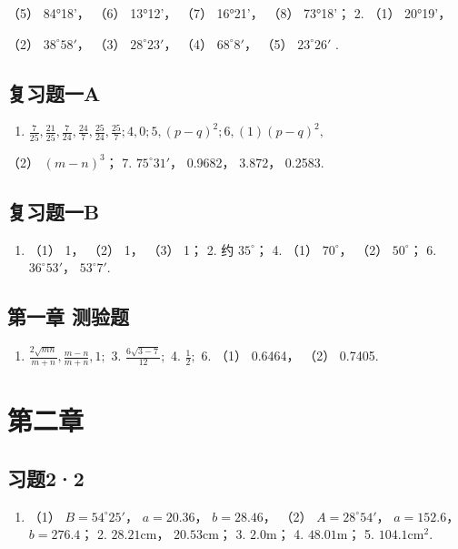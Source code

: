 （5） 84°18'， （6） 13°12'， （7） 16°21'， （8） 73°18'； 2. （1）
20°19'，

（2） \(38^{\circ}58'\)， （3） \(28^{\circ}23'\)， （4）
\(68^{\circ}8'\)， （5） \(23^{\circ}26'\) .

\subsection{复习题一A}

\begin{enumerate}
\item
  \(\frac{7}{25}, \frac{21}{25}, \frac{7}{24}, \frac{24}{7}, \frac{25}{24}, \frac{25}{7}; 4, 0; 5, (p - q)^2; 6, (1) (p - q)^2,\)
\end{enumerate}

（2） \((m - n)^{3}\)； 7. \(75^{\circ}31'\)， 0.9682， 3.872， 0.2583.

\subsection{复习题一B}

\begin{enumerate}
\item
  （1） 1， （2） 1， （3） 1； 2. 约 \(35^{\circ}\)； 4. （1）
  \(70^{\circ}\)， （2） \(50^{\circ}\)； 6. \(36^{\circ}53'\)，
  \(53^{\circ}7'\).
\end{enumerate}

\subsection{第一章 测验题}

\begin{enumerate}
\item
  \(\frac{2\sqrt{mn}}{m+n}, \frac{m-n}{m+n}, 1;\) 3.
  \(\frac{6\sqrt{3-7}}{12};\) 4. \(\frac{1}{2};\) 6. （1） 0.6464，
  （2） 0.7405.
\end{enumerate}

\section{第二章}

\subsection{习题2·2}

\begin{enumerate}
\item
  （1） \(B = 54^{\circ}25'\)， \(a = 20.36\)， \(b = 28.46\)， （2）
  \(A = 28^{\circ}54'\)， \(a = 152.6\)， \(b = 276.4\)； 2.
  \(28.21\mathrm{cm}\)， \(20.53\mathrm{cm}\)； 3. \(2.0\mathrm{m}\)；
  4. \(48.01\mathrm{m}\)； 5. \(104.1\mathrm{cm}^2\).
\end{enumerate}

